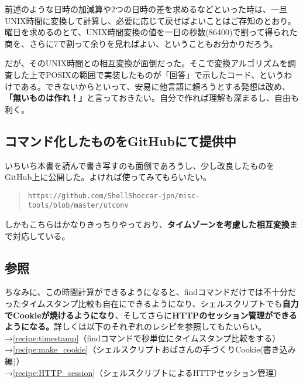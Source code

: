 前述のような日時の加減算や2つの日時の差を求めるなどといった時は、一旦UNIX時間に変換して計算し、必要に応じて戻せばよいことはご存知のとおり。曜日を求めるのとて、UNIX時間変換の値を一日の秒数(86400)で割って得られた商を、さらに7で割って余りを見ればよい、ということもお分かりだろう。

だが、そのUNIX時間との相互変換が面倒だった。そこで変換アルゴリズムを調査した上でPOSIXの範囲で実装したものが「回答」で示したコード、というわけである。できないからといって、安易に他言語に頼ろうとする発想は改め、\textbf{「無いものは作れ！」}と言っておきたい。自分で作れば理解も深まるし、自由も利く。

\subsection*{コマンド化したものをGitHubにて提供中}

いちいち本書を読んで書き写すのも面倒であろうし、少し改良したものをGitHub上に公開した。よければ使ってみてもらいたい。

\begin{quote}
	\verb|https://github.com/ShellShoccar-jpn/misc-tools/blob/master/utconv|
\end{quote}

しかもこちらはかなりきっちりやっており、\textbf{タイムゾーンを考慮した相互変換}まで対応している。

\subsection*{参照}

ちなみに、この時間計算ができるようになると、findコマンドだけでは不十分だったタイムスタンプ比較も自在にできるようになり、シェルスクリプトでも\textbf{自力でCookieが焼けるようになり}、そしてさらに\textbf{HTTPのセッション管理ができるようになる。}詳しくは以下のそれぞれのレシピを参照してもたいらい。\\

\noindent
→\ref{recipe:timestamp}（findコマンドで秒単位にタイムスタンプ比較をする）\\
→\ref{recipe:make_cookie}（シェルスクリプトおばさんの手づくりCookie(書き込み編)） \\
→\ref{recipe:HTTP_session}（シェルスクリプトによるHTTPセッション管理）
